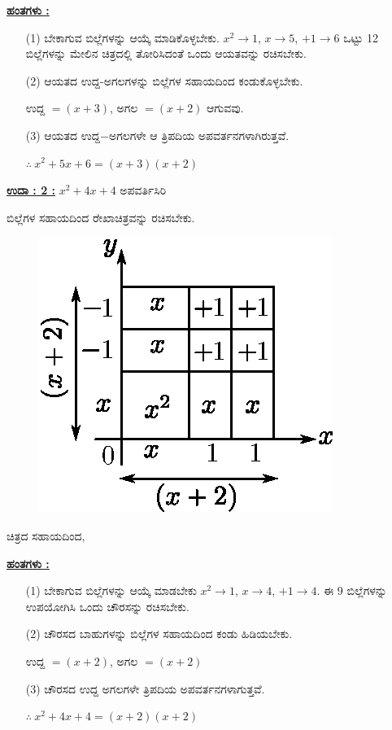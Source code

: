 \noindent
{\textbf{\underline{ಹಂತಗಳು :}}}
\begin{itemize}
\item [(1)] ಬೇಕಾಗುವ ಬಿಲ್ಲೆಗಳನ್ನು ಆಯ್ಕೆ ಮಾಡಿಕೊಳ್ಳಬೇಕು. $x^2 \rightarrow 1$, $x \rightarrow 5$, $+1 \rightarrow 6$ ಒಟ್ಟು 12 ಬಿಲ್ಲೆಗಳನ್ನು ಮೇಲಿನ ಚಿತ್ರದಲ್ಲಿ ತೋರಿಸಿದಂತೆ ಒಂದು ಆಯತ\-ವನ್ನು ರಚಿಸಬೇಕು. 
\item [(2)] ಆಯತದ ಉದ್ದ-ಅಗಲಗಳನ್ನು ಬಿಲ್ಲೆಗಳ ಸಹಾಯದಿಂದ ಕಂಡುಕೊಳ್ಳಬೇಕು. 

ಉದ್ದ $= (x+3)$, ಅಗಲ $= (x+2)$ ಆಗುವವು.

\item [(3)] ಆಯತದ ಉದ್ದ$-$ಅಗಲಗಳೇ ಆ ತ್ರಿಪದಿಯ ಅಪವರ್ತನಗಳಾಗಿರುತ್ತವೆ. 

$\therefore~ x^2 + 5x + 6 = (x+3)(x+2)$
\end{itemize}

\eject

\noindent
{\textbf{\underline{ಉದಾ : 2 :}}} $x^2 + 4x + 4$ ಅಪವರ್ತಿಸಿರಿ 

ಬಿಲ್ಲೆಗಳ ಸಹಾಯದಿಂದ ರೇಖಾಚಿತ್ರವನ್ನು ರಚಿಸಬೇಕು.
\begin{figure}[H]
\centering
\includegraphics[scale=0.8]{src/figure/chap3/fig3-40.eps}
\end{figure}
ಚಿತ್ರದ ಸಹಾಯದಿಂದ,

\noindent
{\textbf{\underline{ಹಂತಗಳು :}}}
\begin{itemize}
\item [(1)] ಬೇಕಾಗುವ ಬಿಲ್ಲೆಗಳನ್ನು ಆಯ್ಕೆ ಮಾಡಬೇಕು $x^2 \rightarrow 1$, $x \rightarrow 4$, $+1 \rightarrow 4$. ಈ 9 ಬಿಲ್ಲೆಗಳನ್ನು ಉಪಯೋಗಿಸಿ ಒಂದು ಚೌರಸನ್ನು ರಚಿಸಬೇಕು. 
\item [(2)] ಚೌರಸದ ಬಾಹುಗಳನ್ನು ಬಿಲ್ಲೆಗಳ ಸಹಾಯದಿಂದ ಕಂಡು ಹಿಡಿಯಬೇಕು. 

ಉದ್ದ $= (x+2)$, ಅಗಲ $= (x+2)$
\item [(3)] ಚೌರಸದ ಉದ್ದ ಅಗಲಗಳೇ ತ್ರಿಪದಿಯ ಅಪವರ್ತನಗಳಾಗುತ್ತವೆ. 

$\therefore~ x^2 + 4x + 4 = (x+2)(x+2)$
\end{itemize}

